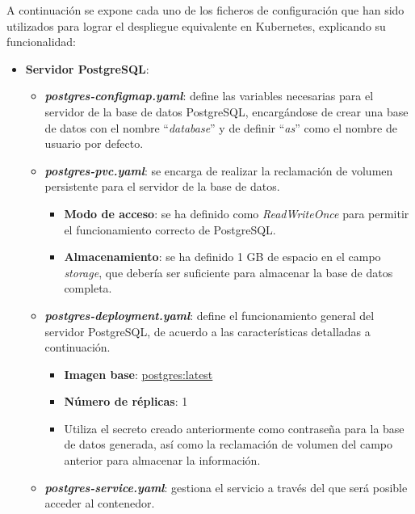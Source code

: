 \documentclass{report}
\begin{document}
            A continuación se expone cada uno de los ficheros de configuración que han sido utilizados para lograr el despliegue equivalente en Kubernetes, explicando su funcionalidad:

            \begin{itemize}
                \item \textbf{Servidor PostgreSQL}:
                \begin{itemize}
                    \item \textit{\textbf{postgres-configmap.yaml}}: define las variables necesarias para el servidor de la base de datos PostgreSQL, encargándose de crear una base de datos con el nombre “\textit{database}” y de definir “\textit{as}” como el nombre de usuario por defecto.
                    \item \textit{\textbf{postgres-pvc.yaml}}: se encarga de realizar la reclamación de volumen persistente para el servidor de la base de datos.
                    \begin{itemize}
                        \item \textbf{Modo de acceso}: se ha definido como \textit{ReadWriteOnce} para permitir el funcionamiento correcto de PostgreSQL.
                        \item \textbf{Almacenamiento}: se ha definido 1 GB de espacio en el campo \textit{storage}, que debería ser suficiente para almacenar la base de datos completa.
                    \end{itemize}
                    \item \textit{\textbf{postgres-deployment.yaml}}: define el funcionamiento general del servidor PostgreSQL, de acuerdo a las características detalladas a continuación.
                    \begin{itemize}
                        \item \textbf{Imagen base}: \href{https://hub.docker.com/_/postgres}{postgres:latest}
                        \item \textbf{Número de réplicas}: 1
                        \item Utiliza el secreto creado anteriormente como contraseña para la base de datos generada, así como la reclamación de volumen del campo anterior para almacenar la información.
                    \end{itemize}
                    \item \textit{\textbf{postgres-service.yaml}}: gestiona el servicio a través del que será posible acceder al contenedor.

\end{itemize}
\end{itemize}
\end{document}
